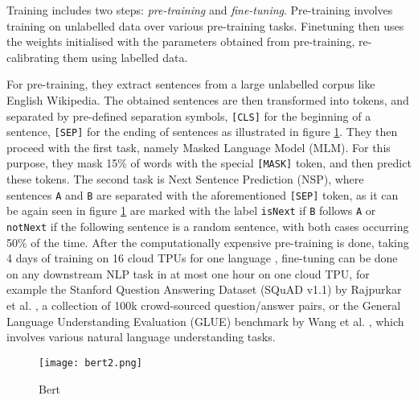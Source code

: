 Training includes two steps: \textit{pre-training} and \textit{fine-tuning}. Pre-training involves training on unlabelled data over various pre-training tasks. Finetuning then uses the weights initialised with the parameters obtained from pre-training, re-calibrating them using labelled data.

For pre-training, they extract sentences from a large unlabelled corpus like English Wikipedia. The obtained sentences are then transformed into tokens, and separated by pre-defined separation symbols, \verb![CLS]! for the beginning of a sentence, \verb![SEP]! for the ending of sentences as illustrated in figure \ref{fig:bert}. They then proceed with the first task, namely Masked Language Model (MLM). For this purpose, they mask 15\% of words with the special \verb![MASK]! token, and then predict these tokens. The second task is Next Sentence Prediction (NSP), where sentences \verb!A! and \verb!B! are separated with the aforementioned \verb![SEP]! token, as it can be again seen in figure \ref{fig:bert} are marked with the label \verb!isNext! if \verb!B! follows \verb!A! or \verb!notNext! if the following sentence is a random sentence, with both cases occurring 50\% of the time. After the computationally expensive pre-training is done, taking 4 days of training on 16 cloud TPUs for one language \cite{googlebert}, fine-tuning can be done on any downstream NLP task in at most one hour on one cloud TPU, for example the Stanford Question Answering Dataset (SQuAD v1.1) by Rajpurkar et al. \cite{rajpurkar2016squad}, a collection of 100k crowd-sourced question/answer pairs, or the General Language Understanding Evaluation (GLUE) benchmark by Wang et al. \cite{wang2018glue}, which involves various natural language understanding tasks. 


\begin{figure}[h]
  \centering
  \texttt{[image: bert2.png]}\\
  \caption{Bert}
  \label{fig:bert}
\end{figure}


\begin{comment}
\begin{figure}[h]
  \centering
  \texttt{[image: bert.png]}\\
  \caption{Bert}
  \label{fig:bert}
\end{figure}
\end{comment}

